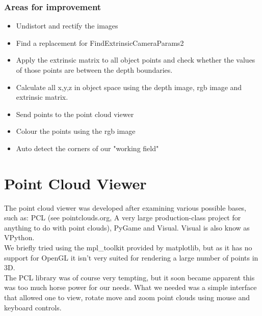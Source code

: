 \subsubsection{Areas for improvement}

\begin{itemize}

\item Undistort and rectify the images%

\item Find a replacement for FindExtrinsicCameraParams2%

\item Apply the extrinsic matrix to all object points and check whether the
values of those points are between the depth boundaries.%

\item Calculate all x,y,z in object space using the depth image, rgb image and
extrinsic matrix.%

\item Send points to the point cloud viewer%

\item Colour the points using the rgb image%

\item Auto detect the corners of our "working field"%

\end{itemize}

\section{Point Cloud Viewer}

The point cloud viewer was developed after examining various possible bases,
such as: PCL (see pointclouds.org, A very large production-class project for
anything to do with point clouds), PyGame and Visual. Visual is also know as
VPython.\\

We briefly tried using the mpl\_toolkit provided by matplotlib, but as it has no
support for OpenGL it isn't very suited for rendering a large number of points
in 3D.\\

The PCL library was of course very tempting, but it soon became apparent this
was too much horse power for our needs. What we needed was a simple interface
that allowed one to view, rotate move and zoom point clouds using mouse and
keyboard controls.\\

